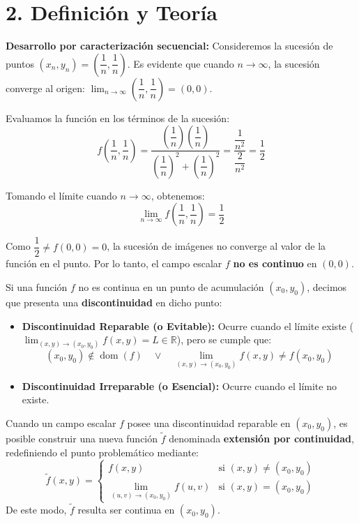 \documentclass[11pt]{article}
\newenvironment{teoria}{%
  \section*{2. Definición y Teoría}%
}{}
\newenvironment{definicion}[1]{%
  \begin{tcolorbox}[colback=blue!5,colframe=blue!75!black,title=Definición: #1]%
}{%
  \end{tcolorbox}%
}
\newenvironment{procesamiento}[1]{%
  \begin{tcolorbox}[colback=gray!5,colframe=gray!60!black,title=Procedimiento: #1]%
}{%
  \end{tcolorbox}%
}
\newenvironment{ejemplo}[1]{%
  \begin{tcolorbox}[colback=white,colframe=gray!40,title=Ejemplo: #1]%
}{%
  \end{tcolorbox}%
}
\begin{document}
\begin{teoria}
\begin{ejemplo}{Uso de Sucesiones para Descartar Continuidad}
    \textbf{Desarrollo por caracterización secuencial:}
    Consideremos la sucesión de puntos $(x_n, y_n) = \left(\dfrac{1}{n}, \dfrac{1}{n}\right)$.
    Es evidente que cuando $n \to \infty$, la sucesión converge al origen: $\displaystyle \lim_{n \to \infty} \left(\dfrac{1}{n}, \dfrac{1}{n}\right) = (0,0)$.
    
    Evaluamos la función en los términos de la sucesión:
    $$ f\left(\dfrac{1}{n}, \dfrac{1}{n}\right) = \dfrac{\left(\dfrac{1}{n}\right)\left(\dfrac{1}{n}\right)}{\left(\dfrac{1}{n}\right)^2 + \left(\dfrac{1}{n}\right)^2} = \dfrac{\dfrac{1}{n^2}}{\dfrac{2}{n^2}} = \dfrac{1}{2} $$
    
    Tomando el límite cuando $n \to \infty$, obtenemos:
    $$ \lim_{n \to \infty} f\left(\dfrac{1}{n}, \dfrac{1}{n}\right) = \dfrac{1}{2} $$
    
    Como $\dfrac{1}{2} \neq f(0,0) = 0$, la sucesión de imágenes no converge al valor de la función en el punto. Por lo tanto, el campo escalar $f$ \textbf{no es continuo} en $(0,0)$.
  \end{ejemplo}

  \begin{definicion}{Tipos de Discontinuidad}
    Si una función $f$ no es continua en un punto de acumulación $(x_0, y_0)$, decimos que presenta una \textbf{discontinuidad} en dicho punto:
    \begin{itemize}
      \item \textbf{Discontinuidad Reparable (o Evitable):} Ocurre cuando el límite existe ($\displaystyle \lim_{(x,y) \to (x_0, y_0)} f(x,y) = L \in \mathbb{R}$), pero se cumple que:
      $$ (x_0, y_0) \notin \operatorname{dom}(f) \quad \vee \quad \lim_{(x,y) \to (x_0, y_0)} f(x,y) \neq f(x_0, y_0) $$
      \item \textbf{Discontinuidad Irreparable (o Esencial):} Ocurre cuando el límite no existe.
    \end{itemize}
  \end{definicion}

  \begin{procesamiento}{Redefinición de una Discontinuidad Reparable}
    Cuando un campo escalar $f$ posee una discontinuidad reparable en $(x_0, y_0)$, es posible construir una nueva función $\tilde{f}$ denominada \textbf{extensión por continuidad}, redefiniendo el punto problemático mediante:
    $$ \tilde{f}(x,y) = \begin{cases} f(x,y) & \text{si } (x,y) \neq (x_0, y_0) \\[0.5em] \lim_{(u,v) \to (x_0, y_0)} f(u,v) & \text{si } (x,y) = (x_0, y_0) \end{cases} $$
    De este modo, $\tilde{f}$ resulta ser continua en $(x_0, y_0)$.
  \end{procesamiento}


\end{teoria}
\end{document}
